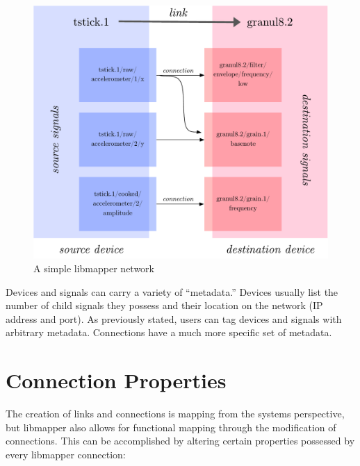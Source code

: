 \begin{figure}[!ht]
\centering
	\includegraphics[width=\textwidth]{figures/libmapper_devices}
\caption{A simple libmapper network}
\label{fig:libmapper_devices}
\end{figure}

Devices and signals can carry a variety of ``metadata.'' Devices usually list the number of child signals they possess and their location on the network (IP address and port). As previously stated, users can tag devices and signals with arbitrary metadata. Connections have a much more specific set of metadata.


	\section{Connection Properties} %
	\label{sec:connection_properties}

The creation of links and connections is mapping from the systems perspective, but libmapper also allows for functional mapping through the modification of connections. This can be accomplished by altering certain properties possessed by every libmapper connection:

